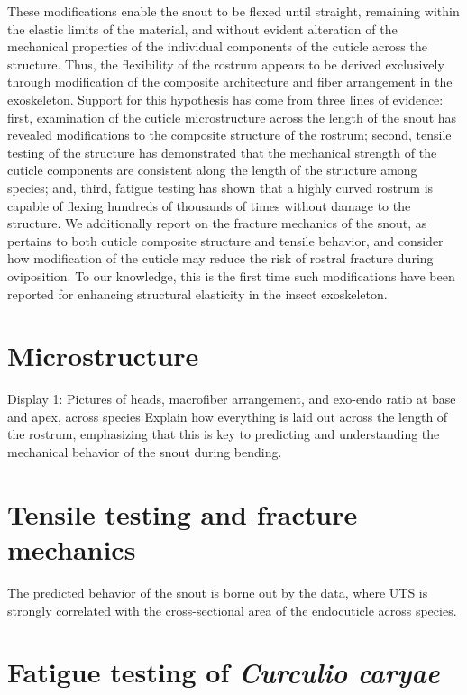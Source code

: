 \documentclass[twocolumn, linenumbers, superscriptaddress]{revtex4-1}
\begin{document}
		
	These modifications enable the snout to be flexed until straight, remaining within the elastic limits of the material, and without evident alteration of the mechanical properties of the individual components of the cuticle across the structure.
	Thus, the flexibility of the rostrum appears to be derived exclusively through modification of the composite architecture and fiber arrangement in the exoskeleton.
	Support for this hypothesis has come from three lines of evidence: first, examination of the cuticle microstructure across the length of the snout has revealed modifications to the composite structure of the rostrum; second, tensile testing of the structure has demonstrated that the mechanical strength of the cuticle components are consistent along the length of the structure among species; and, third, fatigue testing has shown that a highly curved rostrum is capable of flexing hundreds of thousands of times without damage to the structure.
	We additionally report on the fracture mechanics of the snout, as pertains to both cuticle composite structure and tensile behavior, and consider how modification of the cuticle may reduce the risk of rostral fracture during oviposition.
	To our knowledge, this is the first time such modifications have been reported for enhancing structural elasticity in the insect exoskeleton.

	\section*{Microstructure}\label{sec:microstructure} 
		Display 1: Pictures of heads, macrofiber arrangement, and exo-endo ratio at base and apex, across species
		Explain how everything is laid out across the length of the rostrum, emphasizing that this is key to predicting and understanding the mechanical behavior of the snout during bending.
	
	\section*{Tensile testing and fracture mechanics}
		The predicted behavior of the snout is borne out by the data, where UTS is strongly correlated with the cross-sectional area of the endocuticle across species.
		
	\section*{Fatigue testing of \textit{Curculio caryae}}
\end{document}
